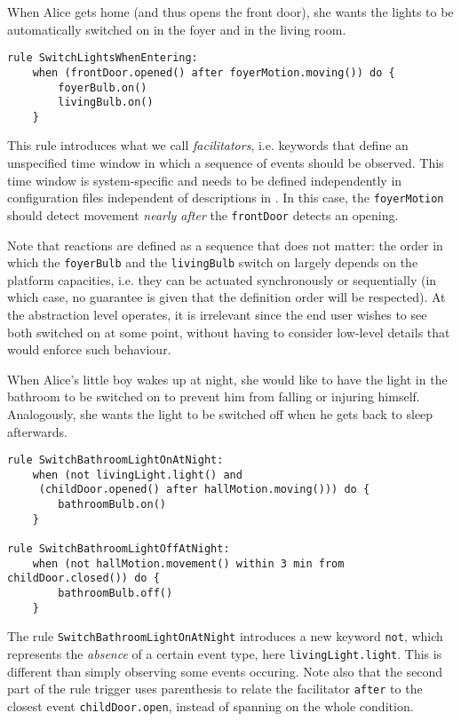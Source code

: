 \begin{description}[leftmargin=0cm]
	\item[Switching entrance lights on when coming in]  When Alice gets home (and thus opens the front door), she wants the lights to be automatically switched on in the foyer and in the living room.
	\begin{lstlisting}[language=iotdsl,
							label=lis:home-rule,
		caption=Rule to switch on the lights at home incoming]
rule SwitchLightsWhenEntering:
	when (frontDoor.opened() after foyerMotion.moving()) do {
		foyerBulb.on() 
		livingBulb.on()
	}
	\end{lstlisting}
	This rule introduces what we call \emph{facilitators}, i.e. keywords that define an unspecified time window in which a sequence of events should be observed. This time window is system-specific and needs to be defined independently in configuration files independent of descriptions in \IOTDSL. In this case, the \lstinline[language=iotdsl]{foyerMotion} should detect movement \emph{nearly after} the \lstinline[language=iotdsl]{frontDoor} detects an opening. 
		
	Note that reactions are defined as a sequence that does not matter: the order in which the \lstinline[language=iotdsl]{foyerBulb} and the \lstinline[language=iotdsl]{livingBulb} switch on largely depends on the platform capacities, i.e. they can be actuated synchronously or sequentially (in which case, no guarantee is given that the definition order will be respected). At the abstraction level \IOTDSL operates, it is irrelevant since the end user wishes to see both switched on at some point, without having to consider low-level details that would enforce such behaviour.

	\item[Illuminate bathroom when children wake up at night] When Alice's little boy wakes up at night, she would like to have the light in the bathroom to be switched on to prevent him from falling or injuring himself. Analogously, she wants the light to be switched off when he gets back to sleep afterwards.
	\begin{lstlisting}[language=iotdsl,
							label=lis:night-rule,
		caption=Rules to switch on\//off lights in the corridor at night]
rule SwitchBathroomLightOnAtNight:	
	when (not livingLight.light() and 
	 (childDoor.opened() after hallMotion.moving())) do {
		bathroomBulb.on()
	}

rule SwitchBathroomLightOffAtNight:	
	when (not hallMotion.movement() within 3 min from childDoor.closed()) do {
		bathroomBulb.off()
	}
	\end{lstlisting}
	The rule \lstinline[language=iotdsl]{SwitchBathroomLightOnAtNight} introduces a new keyword \lstinline[language=iotdsl]{not}, which represents the \emph{absence} of a certain event type, here \lstinline[language=iotdsl]{livingLight.light}. This is different than simply observing some events occuring. Note also that the second part of the rule trigger uses parenthesis to relate the facilitator \lstinline[language=iotdsl]{after} to the closest event \lstinline[language=iotdsl]{childDoor.open}, instead of spanning on the whole condition.


\end{description}
